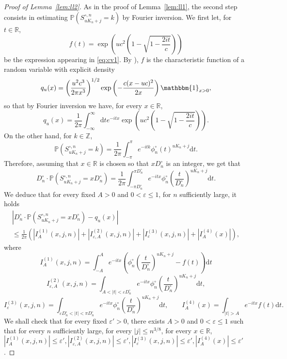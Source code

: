 \documentclass[10pt]{amsart}
\theoremstyle{definition}\newtheorem{defi}[theo]{Definition}\newtheorem{rema}[theo]{Remark}\newtheorem{exam}[theo]{Example}\newtheorem{exem}[theo]{Example}\newtheorem{nota}[theo]{Notation}
\newcommand{\R}{\mathbb{R}}
\def\Scn{S^{\circ,n}}
\def\phicn{\phi^{\circ}_{n}}
\def\Dcn{D^{\circ}_{n}}
\renewcommand{\epsilon}{\varepsilon}
\renewcommand\Pr[1]{\mathbb{P}\left(#1\right)}
\begin{document}
\begin{proof}[Proof of Lemma~\ref{lem:ll2}]
 As in the proof of Lemma~\ref{lem:ll1}, the second step consists in estimating $\Pr{\Scn_{ uK_{n}  +j}=k}$ by Fourier inversion.
 We first let, for $t \in \mathbb{R}$,
\[f(t)=\exp \left( u c^{2} \left( 1 -\sqrt{1-  \frac{2it}{c}}  \right)  \right)\]
be the expression appearing in \eqref{eq:cv1}.
By \cite[Sec.1.2.5]{Kyp06}),  $f$ is the characteristic function of a random variable with explicit density
\[q_u(x)=\left( \frac{u^{2} c^{3}}{2 \pi x^{3}} \right)^{1/2} \exp \left(  - \frac{c (x-uc)^{2} }{2x} \right) \mathbbm{1}_{x>0},\]
so that by Fourier inversion we have, for every $x \in \mathbb{R}$,
\begin{equation}
 \label{eq:fourier}
 q_u(x)=  \frac{1}{2\pi}\int_{-\infty}^{\infty}  {\mathrm{d}t} e^{-itx} \exp \left( u c^{2} \left( 1 -\sqrt{1-  \frac{2it}{c}}  \right)  \right).
 \end{equation}
On the other hand,
for $k \in \mathbb{Z}$,
\[ \Pr{\Scn_{ uK_{n}  +j}=k} = \frac{1}{2\pi} \int_{-\pi}^{\pi} e^{-itk} \phicn(t)^{ uK_{n}  +j} {\mathrm{d}}t.\]
Therefore, assuming that $x \in \R$ is chosen so that $x \Dcn$ is an integer, we get that
\[ \Dcn \cdot \Pr{\Scn_{ uK_{n}  +j}=x  \Dcn}=  \frac{1}{2\pi} \int^{\pi \Dcn}_{-\pi \Dcn} e^{- i t x} \phicn \left(  \frac{t}{\Dcn} \right) ^{ uK_{n}  +j} {\mathrm{d}}t.\]
We deduce that for every fixed $A>0$ and $0< \epsilon \leq 1$, for $n$ sufficiently large, it holds
\begin{multline*}
  \left| \Dcn \cdot \Pr{\Scn_{ uK_{n}  +j}=x  \Dcn} - q_{u}(x)\right| \\
  \leq \frac{1}{2 \pi} (|I^{(1)}_{A}(x,j,n)| + |I^{(2)}_{\epsilon,A}(x,j,n)|+|I^{(3)}_{\epsilon}(x,j,n)|+|I^{(4)}_{A}(x)|),
\end{multline*}
where
\[I^{(1)}_{A}(x,j,n)=\int_{-A}^{A} e^{-i t x} \left(  \phicn \left(  \frac{t}{\Dcn} \right) ^{ uK_{n}  +j}- f(t) \right) {\mathrm{d}}t\]
\[ I^{(2)}_{\epsilon,A}(x,j,n)= \int_{A<|t|< \epsilon \Dcn} e^{-itx} \phicn \left(  \frac{t}{\Dcn} \right) ^{ uK_{n}  +j}{\mathrm{d}}t,\]
\[ I^{(3)}_{\epsilon}(x,j,n)=\int_{\epsilon \Dcn<|t|<\pi \Dcn} e^{-itx} \phicn  \left(  \frac{t}{\Dcn} \right) ^{ uK_{n}  +j} {\mathrm{d}}t, \qquad I^{(4)}_{A}(x)= \int_{|t|>A} e^{-itx} f(t) {\mathrm{d}}t .\]
We shall check that for every fixed $\epsilon'>0$, there exists $A>0$ and $0 < \epsilon \leq 1$ such that for every $n$ sufficiently large, for every $|j| \leq n^{3/8}$, for every $x \in \R$,
 $|I^{(1)}_{A}(x,j,n)| \leq \epsilon', |I^{(2)}_{\epsilon,A}(x,j,n)| \leq \epsilon', |I^{(3)}_{\epsilon}(x,j,n)| \leq \epsilon', |I^{(4)}_{A}(x)| \leq\epsilon'$.



\end{proof}
\end{document}

